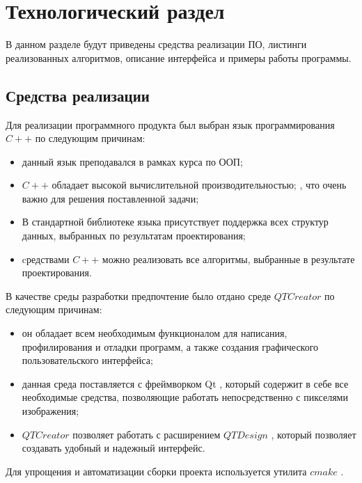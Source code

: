 \chapter{Технологический раздел}


В данном разделе будут приведены средства реализации ПО, листинги реализованных алгоритмов, описание интерфейса и примеры работы программы.

\section{Средства реализации}

Для реализации программного продукта был выбран язык программирования $C++$ \cite{info_pl} по следующим причинам:

\begin{itemize}[label*=--]
	\item данный язык преподавался в рамках курса по ООП;
	\item $C++$ обладает высокой вычислительной производительностью; \cite{info_cmpCplplPy, info_cmpCplplJava}, что очень важно для решения поставленной задачи;
	\item В стандартной библиотеке языка присутствует поддержка всех
	структур данных, выбранных по результатам проектирования;
	\item cредствами $C++$ можно реализовать все алгоритмы, выбранные в результате проектирования.
\end{itemize}

В качестве среды разработки предпочтение было отдано среде $QTCreator$ \cite{info_QtCr} по следующим причинам:

\begin{itemize}[label*=---]
	\item он обладает всем необходимым функционалом для написания, профилирования и
	отладки программ, а также создания графического пользовательского интерфейса;
	\item данная среда поставляется с фреймворком Qt \cite{info_QtDoc}, который содержит в себе все необходимые средства, позволяющие работать непосредственно с
	пикселями изображения;
	\item $QTCreator$ позволяет работать с расширением $QT Design$ \cite{info_QtDes}, который позволяет создавать удобный и надежный интерфейс.
\end{itemize}

Для упрощения и автоматизации сборки проекта используется утилита $cmake$ \cite{info_Cmake}.

